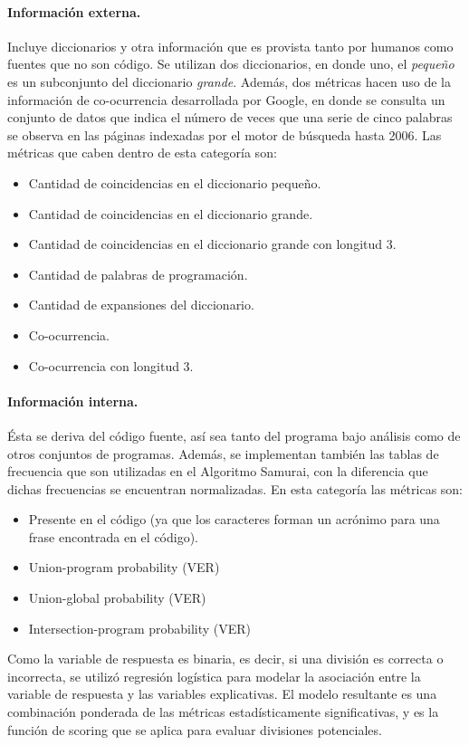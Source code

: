 \paragraph{Información externa.}
Incluye diccionarios y otra información que es provista tanto por humanos como fuentes que no son código.
Se utilizan dos diccionarios, en donde uno, el \textit{pequeño} es un subconjunto del diccionario \textit{grande}.
Además, dos métricas hacen uso de la información de co-ocurrencia desarrollada por Google, en donde se consulta un conjunto de datos que indica el número de veces que una serie de cinco palabras se observa en las páginas indexadas por el motor de búsqueda hasta 2006.
Las métricas que caben dentro de esta categoría son:
\begin{itemize}
  \item Cantidad de coincidencias en el diccionario pequeño.
  \item Cantidad de coincidencias en el diccionario grande.
  \item Cantidad de coincidencias en el diccionario grande con longitud 3.
  \item Cantidad de palabras de programación.
  \item Cantidad de expansiones del diccionario.
  \item Co-ocurrencia.
  \item Co-ocurrencia con longitud 3.
\end{itemize}

\paragraph{Información interna.}
Ésta se deriva del código fuente, así sea tanto del programa bajo análisis como de otros conjuntos de programas.
Además, se implementan también las tablas de frecuencia que son utilizadas en el Algoritmo Samurai, con la diferencia que dichas frecuencias se encuentran normalizadas.
En esta categoría las métricas son:
\begin{itemize}
  \item Presente en el código (ya que los caracteres forman un acrónimo para una frase encontrada en el código).
  \item Union-program probability (VER)
  \item Union-global probability (VER)
  \item Intersection-program probability (VER)
\end{itemize}

Como la variable de respuesta es binaria, es decir, si una división es correcta o incorrecta, se utilizó regresión logística para modelar la asociación entre la variable de respuesta y las variables explicativas.
El modelo resultante es una combinación ponderada de las métricas estadísticamente significativas, y es la función de scoring que se aplica para evaluar divisiones potenciales.

